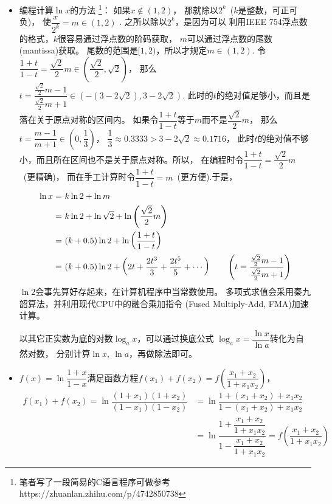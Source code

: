 \begin{itemize}[leftmargin=\inteval{\myitemleftmargin}pt,itemsep=
   \inteval{\myitemitempsep}pt,topsep=\inteval{\myitemtopsep}pt]
\item 编程计算$ \ln x $的方法
\footnote{笔者写了一段简易的C语言程序可做参考
    https://zhuanlan.zhihu.com/p/4742850738 }：
如果$ x\notin (1,2) $，
那就除以$ 2^k $\ ($ k $是整数，可正可负)，
使$ \dfrac{x}{2^k}=m\in(1,2) $ .
之所以除以$ 2^k $，是因为可以
利用IEEE 754浮点数的格式，$ k $很容易通过浮点数的阶码获取，
$ m $可以通过浮点数的尾数(mantissa)获取。
尾数的范围是$ [1,2) $，所以才规定$ m\in(1,2) $.
令$ \dfrac{1+t}{1-t}=\dfrac{\sqrt{2}}{2}m\in
\left(\dfrac{\sqrt{2}}{2},\sqrt{2}\right) $，
那么$ t=\dfrac{\frac{\sqrt{2}}{2}m-1}{\frac{\sqrt{2}}{2}m+1}\in
(-(3-2\sqrt{2}), 3-2\sqrt{2}) $.
此时的$ t $的绝对值足够小，而且是落在关于原点对称的区间内。
如果令$ \dfrac{1+t}{1-t} $等于$ m $而不是$ \dfrac{\sqrt{2}}{2}m $，
那么$ t=\dfrac{m-1}{m+1}\in\left(0,\dfrac{1}{3}\right) $，
$ \dfrac{1}{3}\approx 0.3333 > 3-2\sqrt{2}\approx 0.1716 $，
此时$ t $的绝对值不够小，而且所在区间也不是关于原点对称。所以，
在编程时令$ \dfrac{1+t}{1-t}=\dfrac{\sqrt{2}}{2}m $\ (更精确)，
而在手工计算时令$ \dfrac{1+t}{1-t}=m $\ (更方便).于是，
\begin{align*}
    \ln x=&\ k\ln 2+\ln m \\
    =&\ k\ln 2+\ln\sqrt{2}+\ln\left(\dfrac{\sqrt{2}}{2}m\right) \\
    =&\ (k+0.5)\ln 2+\ln\left(\dfrac{1+t}{1-t}\right) \\
    =&\ (k+0.5)\ln 2+\left(2t+\dfrac{2t^3}{3}+
    \dfrac{2t^5}{5}+\cdots\right) \quad\quad 
    \left(t=\dfrac{\frac{\sqrt{2}}{2}m-1}{\frac{\sqrt{2}}{2}m+1}\right)
\end{align*}
$ \ln 2 $会事先算好存起来，在计算机程序中当常数使用。 
多项式求值会采用秦九韶算法，并利用现代CPU中的融合乘加指令
(Fused Multiply-Add, FMA)加速计算。

以其它正实数为底的对数$ \log_a x $，可以通过换底公式
$ \log_a x=\dfrac{\ln x}{\ln a} $转化为自然对数，
分别计算$ \ln x,\ \ln a $，再做除法即可。

\item $ f(x)=\ln\dfrac{1+x}{1-x} $满足函数方程$ f(x_1)+f(x_2)=
f\left(\dfrac{x_1+x_2}{1+x_1x_2}\right) $，
\begin{align*}
    f(x_1)+f(x_2) =\ln\dfrac{(1+x_1)(1+x_2)}{(1-x_1)(1-x_2)}
    &=\ln\dfrac{1+(x_1+x_2)+x_1x_2}{1-(x_1+x_2)+x_1x_2}\\
    &=\ln\dfrac{1+\dfrac{x_1+x_2}{1+x_1x_2}}{1-\dfrac{x_1+x_2}{1+x_1x_2}}=
    f\left(\dfrac{x_1+x_2}{1+x_1x_2}\right) 
\end{align*}


\end{itemize}
